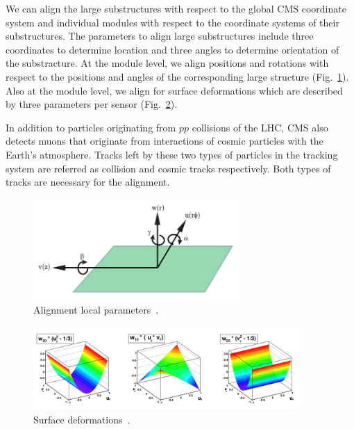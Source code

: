 We can align the large substructures with respect to the global CMS coordinate system and individual modules with respect to the coordinate systems of their substructures. The parameters to align large substructures include three coordinates to determine location and three angles to determine orientation of the substracture. At the module level, we align positions and rotations with respect to the positions and angles of the corresponding large structure (Fig.~\ref{fig:alignmentParameters}). Also at the module level, we align for surface deformations which are described by three parameters per sensor (Fig.~\ref{fig:surfaceDeformations}). 

In addition to particles originating from $pp$ collisions of the LHC, CMS also detects muons that originate from interactions of cosmic particles with the Earth's atmosphere. Tracks left by these two types of particles in the tracking system are referred as collision and cosmic tracks respectively. Both types of tracks are necessary for the alignment. %

\begin{figure}[htb]
    \begin{center}
        \includegraphics[width=0.70\textwidth]{../figs/Alignment/alignment_strip_coords.png}
    \end{center}
    \caption{Alignment local parameters~\cite{ref_Frank_thesis}.}
    \label{fig:alignmentParameters}
\end{figure}

\begin{figure}[htb]
    \begin{center}
        \includegraphics[width=0.90\textwidth]{../figs/Alignment/alignment_surface_deformations.png}
    \end{center}
    \caption{Surface deformations~\cite{ref_Alignment}.}
    \label{fig:surfaceDeformations}
\end{figure}

